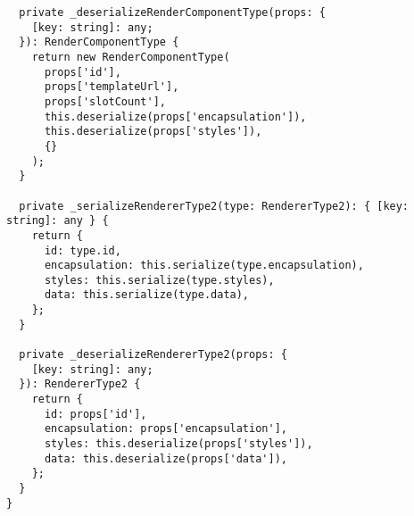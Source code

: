 \begin{verbatim}
  private _deserializeRenderComponentType(props: {
    [key: string]: any;
  }): RenderComponentType {
    return new RenderComponentType(
      props['id'],
      props['templateUrl'],
      props['slotCount'],
      this.deserialize(props['encapsulation']),
      this.deserialize(props['styles']),
      {}
    );
  }

  private _serializeRendererType2(type: RendererType2): { [key: string]: any } {
    return {
      id: type.id,
      encapsulation: this.serialize(type.encapsulation),
      styles: this.serialize(type.styles),
      data: this.serialize(type.data),
    };
  }

  private _deserializeRendererType2(props: {
    [key: string]: any;
  }): RendererType2 {
    return {
      id: props['id'],
      encapsulation: props['encapsulation'],
      styles: this.deserialize(props['styles']),
      data: this.deserialize(props['data']),
    };
  }
}
\end{verbatim}
